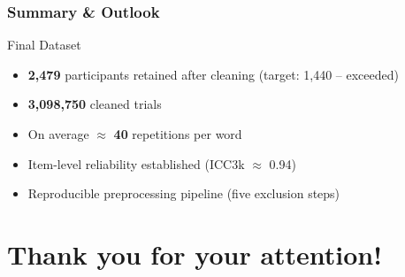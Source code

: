 \documentclass[aspectratio=169,10pt]{beamer}
\begin{document}
\begin{frame}
    \frametitle{Summary \& Outlook}
    \begin{block}{Final Dataset}
        \begin{itemize}
            \item \textbf{2,479} participants retained after cleaning (target: 1,440 -- exceeded)
            \item \textbf{3,098,750} cleaned trials
            \item  On average $\approx$ \textbf{40} repetitions per word
            \item Item-level reliability established (ICC3k $\approx$ 0.94)
            \item Reproducible preprocessing pipeline (five exclusion steps)
        \end{itemize}
    \end{block}
\end{frame}


\section{Thank you for your attention!}
\end{document}

